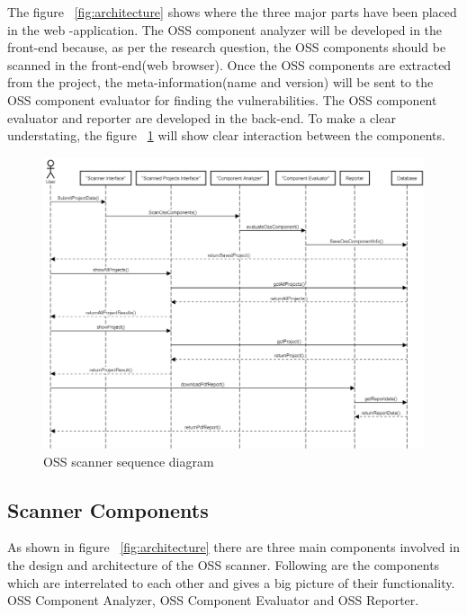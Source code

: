 \newpage
The figure ~\ref{fig:architecture} shows where the three major parts have been placed in the web -application. The \acs{OSS} component analyzer will be developed in the front-end because, as per the research question, the \acs{OSS} components should be scanned in the front-end(web browser). Once the \acs{OSS} components are extracted from the project, the meta-information(name and version) will be sent to the \acs{OSS} component evaluator for finding the vulnerabilities. The \acs{OSS} component evaluator and reporter are developed in the back-end. To make a clear understating, the figure ~\ref{fig:sequence} will show clear interaction between the components.
\begin{figure}[h!]
	\includegraphics[width=15cm]{includes/sequence_diagram.png}
	\centering
	\caption{\acs{OSS} scanner sequence diagram}
	\label{fig:sequence}
\end{figure} 
\subsection{Scanner Components}

As shown in figure ~\ref{fig:architecture} there are three main components involved in the design and architecture of the \acs{OSS} scanner. Following are the components which are interrelated to each other and gives a big picture of their functionality. \acs{OSS} Component Analyzer, \acs{OSS} Component Evaluator and \acs{OSS} Reporter.

